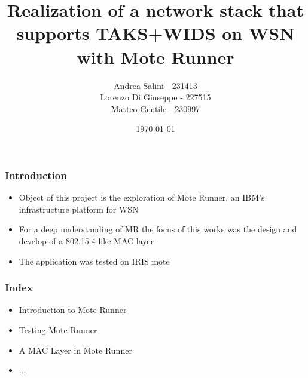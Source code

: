 \documentclass[12pt, compress]{beamer}
\title{Realization of a network stack that supports TAKS+WIDS on WSN with Mote Runner}
\subtitle{}
\date{\today}
\author{Andrea Salini - 231413\\Lorenzo Di Giuseppe - 227515\\Matteo Gentile - 230997}
\institute{DISIM - Università degli Studi dell’Aquila}
\begin{document}
  \maketitle
  
\begin{frame}[fragile]
  \frametitle{Introduction}
  \begin{itemize}
    \item Object of this project is the exploration of Mote Runner, an IBM’s infrastructure platform for WSN
    \item For a deep understanding of MR the focus of this works was the design and develop of a 802.15.4-like MAC layer
    \item The application was tested on IRIS mote
  \end{itemize}
\end{frame}

\begin{frame}[fragile]
  \frametitle{Index}
  \begin{itemize}
    \item Introduction to Mote Runner
    \item Testing Mote Runner
    \item A MAC Layer in Mote Runner
    \item ...
  \end{itemize}
\end{frame}





\end{document}
